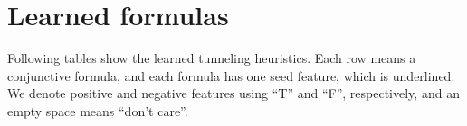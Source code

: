 
\section{Learned formulas}
Following tables show the learned tunneling heuristics. Each row means a conjunctive formula, and each formula has one seed feature, which is underlined. We denote positive and negative features using ``T'' and ``F'', respectively, and an empty space means ``don't care''.
\label{app:formulas}
